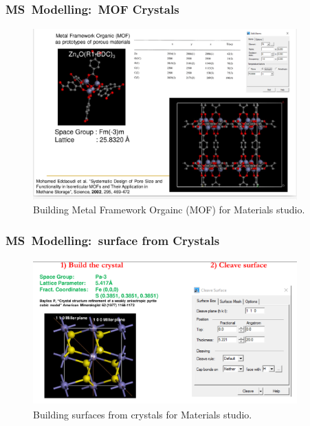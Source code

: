 \frame
{
	\frametitle{\textrm{MS~Modelling:~MOF Crystals}}
\begin{figure}[h!]
\centering
\vspace*{-0.18in}
\includegraphics[height=2.60in,width=4.00in,viewport=0 0 1148 740,clip]{Figures/MS-Building_MOF.png}
\caption{\tiny \textrm{Building Metal Framework Orgainc (MOF) for Materials studio.}}%
\label{MS-Building_MOF}
\end{figure}
}

%
\frame
{
	\frametitle{\textrm{MS~Modelling:~surface from Crystals}}
\begin{figure}[h!]
\centering
\vspace*{-0.10in}
\includegraphics[height=2.20in,width=4.00in,viewport=0 0 1349 724,clip]{Figures/MS-Building_Cleave_Surface.png}
\caption{\tiny \textrm{Building surfaces from crystals for Materials studio.}}%
\label{MS-Building_Cleave_Surface}
\end{figure}
}

